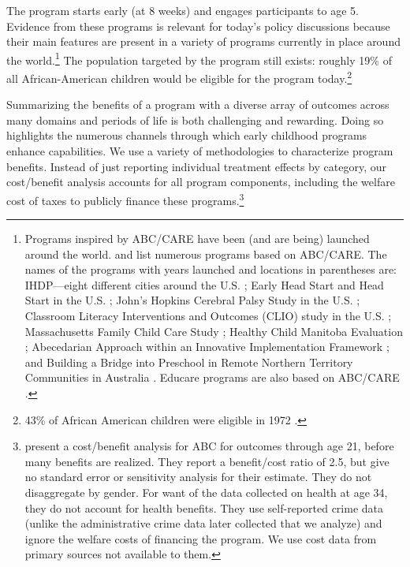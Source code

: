 The program starts early (at 8 weeks) and engages participants to age 5. Evidence from these programs is relevant for today's policy discussions because their main features are present in a variety of programs currently in place around the world.\footnote{Programs inspired by ABC/CARE have been (and are being) launched around the world. \citet{Sparling_2010_Highlights} and \citet{Ramey_Ramey_Lanzi_2014_Interventions} list numerous programs based on ABC/CARE. The names of the programs with years launched and locations in parentheses are: IHDP---eight different cities around the U.S. \citep{Spiker-etal_1997_Helping}; Early Head Start and Head Start in the U.S. \citep{Schneider_McDonald-eds_2007_Scale-Up_Vol-1}; John's Hopkins Cerebral Palsy Study in the U.S. \citep{Sparling_2010_Highlights}; Classroom Literacy Interventions and Outcomes (CLIO) study in the U.S. \citep{Sparling_2010_Highlights}; Massachusetts Family Child Care Study \citep{Collins_etal_2010_Massachusetts-Study}; Healthy Child Manitoba Evaluation \citep{Healthy_Child_Manitoba_2015_Starting-Early}; Abecedarian Approach within an Innovative Implementation Framework \citep{Jensen_Nielsen_2016_ABC-Programme-Pilot}; and Building a Bridge into Preschool in Remote Northern Territory Communities in Australia \citep{UMonash_Dataset_2015_URL}. Educare programs are also based on ABC/CARE \citep{Educare_2014_Research_Agenda,Yazejian_Bryant_2012_Educare}.} The population targeted by the program still exists: roughly 19\% of all African-American children would be eligible for the program today.\footnote{43\% of African American children were eligible in 1972 \citep{Garcia_2016_National-Implementation-ECI}.}

Summarizing the benefits of a program with a diverse array of outcomes across many domains and periods of life is both challenging and rewarding. Doing so highlights the numerous channels through which early childhood programs enhance capabilities. We use a variety of methodologies to characterize program benefits. Instead of just reporting individual treatment effects by category, our cost/benefit analysis accounts for all program components, including the welfare cost of taxes to publicly finance these programs.\footnote{\cite{Barnett_Masse_2002_benefitcost,Barnett_Masse_2007_EER} present a cost/benefit analysis for ABC for outcomes through age 21, before many benefits are realized. They report a benefit/cost ratio of 2.5, but give no standard error or sensitivity analysis for their estimate. They do not disaggregate by gender. For want of the data collected on health at age 34, they do not account for health benefits. They use self-reported crime data (unlike the administrative crime data later collected that we analyze) and ignore the welfare costs of financing the program. We use cost data from primary sources not available to them.}


